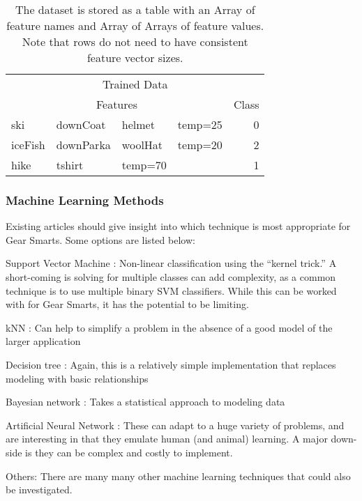 \begin{table}
    \begin{tabular}{llllr}
        \hline
        \multicolumn{5}{c}{Trained Data} \\
        \multicolumn{4}{c}{Features} & Class \\
        \hline
        ski     & downCoat  & helmet      & temp=25  & 0 \\
        iceFish & downParka  & woolHat      & temp=20  & 2 \\
        hike    & tshirt & temp=70  & & 1 \\
        \hline
    \end{tabular}
    \caption{The dataset is stored as a table with an Array of feature names and Array of Arrays of feature values. Note that rows
    do not need to have consistent feature vector sizes.}
    \label{table:datarow}
\end{table}


\subsubsection{Machine Learning Methods}
\label{section:mloptions}
Existing articles should give insight into which technique is
most appropriate for Gear Smarts. Some options are listed below:

\begin{description}
  \item{Support Vector Machine \cite{SVM}:} Non-linear classification using the ``kernel trick.'' A short-coming is solving for multiple
  classes can add complexity, as a common technique is to use multiple binary SVM classifiers. While this can be worked with
  for Gear Smarts, it has the potential to be limiting.
  \item{kNN \cite{KNN}:} Can help to simplify a problem in the absence of a good model of the larger application
  \item{Decision tree \cite{DecisionTree}:} Again, this is a relatively simple implementation that replaces modeling with basic relationships
  \item{Bayesian network \cite{BayesianNetwork}:} Takes a statistical approach to modeling data
  \item{Artificial Neural Network \cite{ANN}:} These can adapt to a huge variety of problems, and are interesting in that they emulate
  human (and animal) learning. A major down-side is they can be complex and costly to implement.
  \item{Others:} There are many many other machine learning techniques that could also be investigated.
\end{description}

